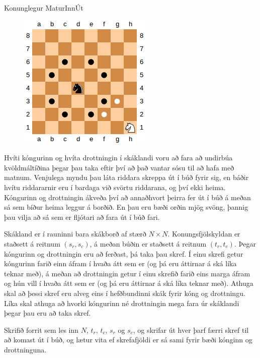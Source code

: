 \begin{problem}{Konunglegur Matur}{Inn}{Út}{~}{~}

	\begin{figure}
		\vspace{-25pt}
		\begin{center}
			\includegraphics[scale=0.5]{../KonunglegurMatur/skak_riddari.png}
		\end{center}
		\vspace{-20pt}
	\end{figure}

	Hvíti kóngurinn og hvíta drottningin í skáklandi voru að fara að undirbúa kvöldmáltíðina þegar þau taka eftir því að það vantar sósu til að hafa með matnum. Venjulega myndu þau láta riddara skreppa út í búð fyrir sig, en báðir hvítu riddararnir eru í bardaga við svörtu riddarana, og því ekki heima. Kóngurinn og drottningin ákveða því að annaðhvort þeirra fer út í búð á meðan sá sem bíður heima leggur á borðið. En þau eru bæði orðin mjög svöng, þannig þau vilja að sá sem er fljótari að fara út í búð fari.

	Skákland er í rauninni bara skákborð af stærð $N\times N$. Konungsfjölskyldan er staðsett á reitnum $(s_r, s_c)$, á meðan búðin er staðsett á reitnum $(t_r, t_c)$. Þegar kóngurinn og drottningin eru að ferðast, þá taka þau skref. Í einu skrefi getur kóngurinn farið einn áfram í hvaða átt sem er (og þá eru áttirnar á ská líka teknar með), á meðan að drottningin getur í einu skrefið farið eins marga áfram og hún vill í hvaða átt sem er (og þá eru áttirnar á ská líka teknar með). Athuga skal að þessi skref eru alveg eins í hefðbundinni skák fyrir kóng og drottningu. Líka skal athuga að hvorki kóngurinn né drottningin mega fara úr skáklandi þegar þau eru að taka skref.

	Skrifið forrit sem les inn $N$, $t_r$, $t_c$, $s_r$ og $s_c$, og skrifar út hver þarf færri skref til að komast út í búð, og lætur vita ef skrefafjöldi er sá sami fyrir bæði kónginn og drottninguna.


\end{problem}
